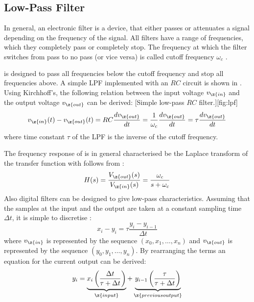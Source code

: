\subsection{Low-Pass Filter}\label{sec:lfp}
In general, an electronic filter is a device, that either passes or attenuates a signal depending on the frequency of the signal. All filters have a range of frequencies, which they completely pass or completely stop. The frequency at which the filter switches from pass to no pass (or vice versa) is called cutoff frequency $\omega_c$ \cite{filter}.\par 
%
 is designed to pass all frequencies below the cutoff frequency and stop all frequencies above. A simple \ac{LPF} implemented with an $RC$ circuit is shown in . Using Kirchhoff's, the following relation between the input voltage $v_{\z{in}}$ and the output voltage $v_{\z{out}}$ can be derived:
%
[Simple low-pass $RC$ filter.][fig:lpf]
%
\begin{equation}\label{eq:lpf}
  v_{\z{in}}(t) - v_{\z{out}}(t) = RC\dfrac{dv_{\z{out}}}{dt} = \dfrac{1}{\omega_c}\dfrac{dv_{\z{out}}}{dt} = \tau \dfrac{dv_{\z{out}}}{dt}
\end{equation}
%
where time constant $\tau$ of the \ac{LPF} is the inverse of the cutoff frequency.\par
%
The frequency response of  is in general characterised be the Laplace transform of the transfer function with follows from :
%
\begin{equation}
  H(s) = \dfrac{V_{\z{out}}(s)}{V_{\z{in}}(s)} = \dfrac{\omega_c}{s + \omega_c}
\end{equation}
%
Also digital filters can be designed to give low-pass characteristics. Assuming that the samples at the input and the output are taken at a constant sampling time $\Delta t$, it is simple to discretise : 
%
\begin{equation}
  x_i - y_i = \tau\dfrac{y_i - y_{i-1}}{\Delta t}
\end{equation}
%
where $v_{\z{in}}$ is represented by the sequence $(x_0, x_1, \ldots, x_n)$ and $v_{\z{out}}$ is represented by the sequence $(y_0, y_1, \ldots, y_n)$. By rearranging the terms an equation for the current output can be derived:
%
\begin{equation}
  y_i = \underbrace{x_i\left(\dfrac{\Delta t}{\tau + \Delta t}\right)}_{\z{input}} + \underbrace{y_{i-1}\left(\dfrac{\tau}{\tau + \Delta t}\right)}_{\z{previous output}}
\end{equation}
